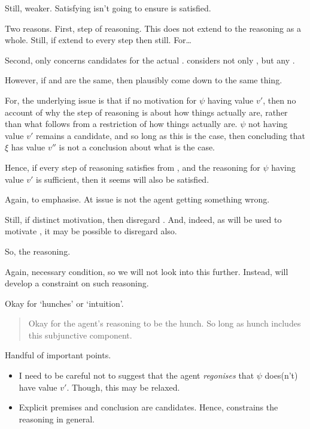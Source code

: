 \begin{note}
  Still, weaker.
  Satisfying \ideaCS{} isn't going to ensure \ideaS{} is satisfied.

  Two reasons.
  First, step of reasoning.
  This does not extend to the reasoning as a whole.
  Still, if extend to every step then still.
  For\dots

  Second, only concerns candidates for the actual \world{}.
  \ideaS{} considers not only \epVAd{} , but any \epPAd{} \world{}.

  However, if \epVAd{} and \epPAd{}  are the same, then plausibly come down to the same thing.

    For, the underlying issue is that if no motivation for \(\psi\) having value \(v'\), then no account of why the step of reasoning is about how things actually are, rather than what follows from a restriction of how things actually are.
  \(\psi\) not having value \(v'\) remains a candidate, and so long as this is the case, then concluding that \(\xi\) has value \(v''\) is not a conclusion about what is the case.

  Hence, if every step of reasoning satisfies \ideaCS{} from \epPAd{} \world{}, and the reasoning for \(\psi\) having value \(v'\) is sufficient, then it seems \ideaS{} will also be satisfied.

  Again, to emphasise.
  At issue is not the agent getting something wrong.

  Still, if distinct motivation, then disregard \ideaS{}.
  And, indeed, as \ideaCS{} will be used to motivate \ideaCSC{}, it may be possible to disregard \ideaCS{} also.
\end{note}

\begin{note}
  So, the reasoning.
\end{note}

\begin{note}
  Again, necessary condition, so we will not look into this further.
  Instead, \ideaCSC{} will develop a constraint on such reasoning.

  Okay for `hunches' or `intuition'.
    \begin{quote}
    Okay for the agent's reasoning to be the hunch.
    So long as hunch includes this subjunctive component.
  \end{quote}
\end{note}

\begin{note}
  Handful of important points.
  \begin{itemize}
  \item I need to be careful not to suggest that the agent \emph{regonises} that \(\psi\) does(n't) have value \(v'\).
    Though, this may be relaxed.
  \item Explicit premises and conclusion are candidates.
  Hence, \label{idea:CS:B:step:requ} constrains the reasoning in general.
  \end{itemize}
\end{note}

